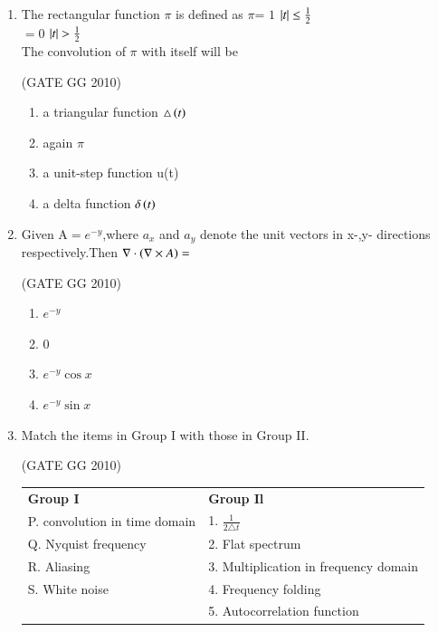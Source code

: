 \documentclass[journal]{IEEEtran}
\begin{document}
\begin{enumerate}[start=26]
\item The rectangular function $\pi$ is defined as $\pi$= $1$ \hspace{0.7cm}   $\left\vert t\right\vert\leq \frac{1}{2}$\\
\hspace*{6.7cm} $=0$ \hspace{0.7cm} $\left\vert t\right\vert >\frac{1}{2}$\\
The convolution of $\pi$ with itself will be 

\hfill (GATE GG 2010) 


\begin{enumerate}
    \item a triangular function $\triangle\left(t\right)$
    \item  again $\pi$
\item a unit-step function u(t)
\item a delta function $\delta\left(t\right)$
\end{enumerate}


\item Given A$=e^{-y}$,where ${a_x}$ and $a_y$ denote the unit vectors in x-,y- directions respectively.Then $\nabla\cdot\left(\nabla \times A\right)=$ 

\hfill(GATE GG 2010)
\begin{multicols}{4}
\begin{enumerate}
    \item $e^{-y}$
    \item 0
    \item $e^{-y}\cos{x}$
    \item $e^{-y}\sin{x}$
\end{enumerate}
\end{multicols}

\item Match the items in Group I with those in Group II.

\hfill (GATE GG 2010) \\
\begin{tabular}{ l l }
\textbf{Group I} & \textbf{Group Il}\\

P. convolution in time domain & 1. $\frac{1}{2\triangle t}$\\
Q. Nyquist frequency & 2. Flat spectrum\\
R. Aliasing & 3. Multiplication in frequency domain\\
S. White noise & 4. Frequency folding\\
& 5. Autocorrelation function
\end{tabular}


\end{enumerate}
\end{document}
